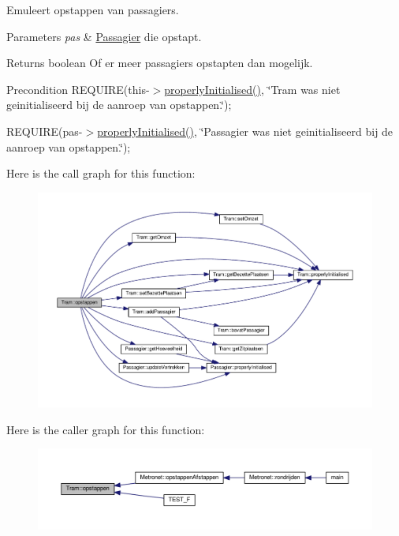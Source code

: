 Emuleert opstappen van passagiers. 


\begin{DoxyParams}{Parameters}
{\em pas} & \hyperlink{class_passagier}{Passagier} die opstapt. \\
\hline
\end{DoxyParams}
\begin{DoxyReturn}{Returns}
boolean Of er meer passagiers opstapten dan mogelijk. 
\end{DoxyReturn}
\begin{DoxyPrecond}{Precondition}
R\+E\+Q\+U\+I\+RE(this-\/$>$\hyperlink{class_tram_a98992eff0453f54fbe64e1f1064169c7}{properly\+Initialised()}, \char`\"{}\+Tram was niet geinitialiseerd bij de aanroep van opstappen.\char`\"{}); 

R\+E\+Q\+U\+I\+RE(pas-\/$>$\hyperlink{class_tram_a98992eff0453f54fbe64e1f1064169c7}{properly\+Initialised()}, \char`\"{}\+Passagier was niet geinitialiseerd bij de aanroep van opstappen.\char`\"{}); 
\end{DoxyPrecond}


Here is the call graph for this function\+:
\nopagebreak
\begin{figure}[H]
\begin{center}
\leavevmode
\includegraphics[width=350pt]{class_tram_af42c023f82a85f68ec60cfa7b52d4d85_cgraph}
\end{center}
\end{figure}




Here is the caller graph for this function\+:
\nopagebreak
\begin{figure}[H]
\begin{center}
\leavevmode
\includegraphics[width=350pt]{class_tram_af42c023f82a85f68ec60cfa7b52d4d85_icgraph}
\end{center}
\end{figure}


